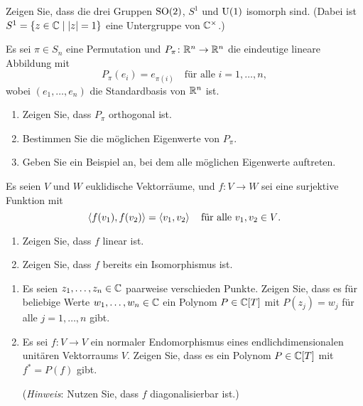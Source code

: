 \begin{question}[subtitle = Rotationsgruppen]{3}
  Zeigen Sie, dass die drei Gruppen $\operatorname{SO}(2)$, $S^1$ und $\operatorname{U}(1)$ isomorph sind.
  (Dabei ist $S^1 = \{z \in \mathbb{C} \mid |z| = 1\}$ eine Untergruppe von $\mathbb{C}^\times$.)
\end{question}


\begin{question}[subtitle = Permutationsmatrizen sind orthogonal]{3}
  Es sei $\pi \in S_n$ eine Permutation und $P_\pi \colon \mathbb{R}^n \to \mathbb{R}^n$ die eindeutige lineare Abbildung mit
  \[
    P_\pi(e_i) = e_{\pi(i)}
    \quad
    \text{für alle $i = 1, \dotsc, n$},
  \]
  wobei $(e_1, \dotsc, e_n)$ die Standardbasis von $\mathbb{R}^n$ ist.
  \begin{enumerate}[leftmargin=*]
    \item
      Zeigen Sie, dass $P_\pi$ orthogonal ist.
    \item
      Bestimmen Sie die möglichen Eigenwerte von $P_\pi$.
    \item
      Geben Sie ein Beispiel an, bei dem alle möglichen Eigenwerte auftreten.
  \end{enumerate}
\end{question}


\begin{question}[subtitle = Linearität orthogonaler Abbildungen]{3}
  Es seien $V$ und $W$ euklidische Vektorräume, und $f \colon V \to W$ sei eine surjektive Funktion mit
  \[
    \left\langle f(v_1), f(v_2) \right\rangle = \left\langle v_1, v_2 \right\rangle
    \quad
    \text{für alle $v_1, v_2 \in V$}.
  \]
  \begin{enumerate}[leftmargin=*]
    \item
      Zeigen Sie, dass $f$ linear ist.
    \item
      Zeigen Sie, dass $f$ bereits ein Isomorphismus ist.
  \end{enumerate}
\end{question}


\begin{question}[subtitle = Die Adjungierte Abblidung als Polynom]{3}
  \begin{enumerate}[leftmargin=*]
    \item
      Es seien $z_1, \dotsc, z_n \in \mathbb{C}$ paarweise verschieden Punkte.
      Zeigen Sie, dass es für beliebige Werte $w_1, \dotsc, w_n \in \mathbb{C}$ ein Polynom $P \in \mathbb{C}[T]$ mit $P(z_j) = w_j$ für alle $j = 1, \dotsc, n$ gibt.
    \item
      Es sei $f \colon V \to V$ ein normaler Endomorphismus eines endlichdimensionalen unitären Vektorraums $V$.
      Zeigen Sie, dass es ein Polynom $P \in \mathbb{C}[T]$ mit $f^* = P(f)$ gibt.
      
      (\emph{Hinweis}:
       Nutzen Sie, dass $f$ diagonalisierbar ist.)
  \end{enumerate}
\end{question}





